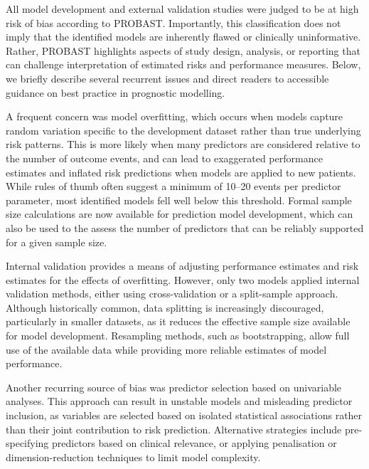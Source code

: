 All model development and external validation studies were judged to be at high risk of bias according to PROBAST. Importantly, this classification does not imply that the identified models are inherently flawed or clinically uninformative. Rather, PROBAST highlights aspects of study design, analysis, or reporting that can challenge interpretation of estimated risks and performance measures\cite{moons2019}. Below, we briefly describe several recurrent issues and direct readers to accessible guidance on best practice in prognostic modelling.

A frequent concern was model overfitting, which occurs when models capture random variation specific to the development dataset rather than true underlying risk patterns. This is more likely when many predictors are considered relative to the number of outcome events, and can lead to exaggerated performance estimates and inflated risk predictions when models are applied to new patients\cite{dhimanSampleSizeRequirements2023,steyerberg2019book}. While rules of thumb often suggest a minimum of 10--20 events per predictor parameter, most identified models fell well below this threshold. Formal sample size calculations are now available for prediction model development, which can also be used to the assess the number of predictors that can be reliably supported for a given sample size\cite{riley2019B}.

Internal validation provides a means of adjusting performance estimates and risk estimates for the effects of overfitting. However, only two models applied internal validation methods, either using cross-validation\cite{abongomeraDevelopmentExternalValidation2017} or a split-sample approach\cite{coura-vitalPrognosticFactorsScoring2014}. Although historically common, data splitting is increasingly discouraged, particularly in smaller datasets, as it reduces the effective sample size available for model development. Resampling methods, such as bootstrapping, allow full use of the available data while providing more reliable estimates of model performance\cite{moons2015}.

Another recurring source of bias was predictor selection based on univariable analyses. This approach can result in unstable models and misleading predictor inclusion, as variables are selected based on isolated statistical associations rather than their joint contribution to risk prediction. Alternative strategies include pre-specifying predictors based on clinical relevance, or applying penalisation or dimension-reduction techniques to limit model complexity\cite{moons2019,efthimiou2024}.

